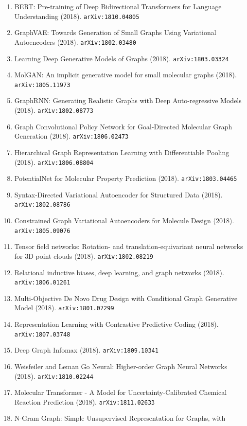 \documentclass[11pt]{article}
\begin{document}
\begin{enumerate}
  \item BERT: Pre-training of Deep Bidirectional Transformers for Language
  Understanding (2018). \texttt{arXiv:1810.04805}
  \item GraphVAE: Towards Generation of Small Graphs Using Variational
  Autoencoders (2018). \texttt{arXiv:1802.03480}
  \item Learning Deep Generative Models of Graphs (2018). \texttt{arXiv:1803.03324}
  \item MolGAN: An implicit generative model for small molecular graphs (2018). \texttt{arXiv:1805.11973}
  \item GraphRNN: Generating Realistic Graphs with Deep Auto-regressive Models (2018). \texttt{arXiv:1802.08773}
  \item Graph Convolutional Policy Network for Goal-Directed Molecular Graph
  Generation (2018). \texttt{arXiv:1806.02473}
  \item Hierarchical Graph Representation Learning with Differentiable Pooling (2018). \texttt{arXiv:1806.08804}
  \item PotentialNet for Molecular Property Prediction (2018). \texttt{arXiv:1803.04465}
  \item Syntax-Directed Variational Autoencoder for Structured Data (2018). \texttt{arXiv:1802.08786}
  \item Constrained Graph Variational Autoencoders for Molecule Design (2018). \texttt{arXiv:1805.09076}
  \item Tensor field networks: Rotation- and translation-equivariant neural
  networks for 3D point clouds (2018). \texttt{arXiv:1802.08219}
  \item Relational inductive biases, deep learning, and graph networks (2018). \texttt{arXiv:1806.01261}
  \item Multi-Objective De Novo Drug Design with Conditional Graph Generative
  Model (2018). \texttt{arXiv:1801.07299}
  \item Representation Learning with Contrastive Predictive Coding (2018). \texttt{arXiv:1807.03748}
  \item Deep Graph Infomax (2018). \texttt{arXiv:1809.10341}
  \item Weisfeiler and Leman Go Neural: Higher-order Graph Neural Networks (2018). \texttt{arXiv:1810.02244}
  \item Molecular Transformer - A Model for Uncertainty-Calibrated Chemical
  Reaction Prediction (2018). \texttt{arXiv:1811.02633}
  \item N-Gram Graph: Simple Unsupervised Representation for Graphs, with

\end{enumerate}
\end{document}

